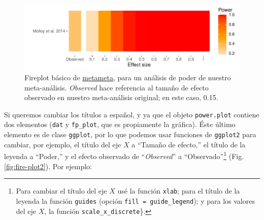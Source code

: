 \documentclass[
  bookmarksnumbered]{article}
\begin{document}
\begin{figure}
\centering
\includegraphics{Meta-analysis_files/figure-latex/fire-plot1-1.pdf}
\caption{\label{fig:fire-plot1}Fireplot básico de \href{https://www.dsquintana.blog/metameta-r-package-meta-analysis/}{metameta}, para un análisis de poder de nuestro meta-análisis. \emph{Observed} hace referencia al tamaño de efecto observado en nuestro meta-análisis original; en este caso, 0.15.}
\end{figure}

Si queremos cambiar los títulos a español, y ya que el objeto \texttt{power.plot} contiene dos elementos (\texttt{dat} y \texttt{fp\_plot}, que es propiamente la gráfica). Éste último elemento es de clase \texttt{ggplot}, por lo que podemos usar funciones de \texttt{ggplot2} para cambiar, por ejemplo, el título del eje \(X\) a ``Tamaño de efecto,'' el título de la leyenda a ``Poder,'' y el efecto observado de ``\emph{Observed}'' a ``Observado''\footnote{Para cambiar el título del eje \(X\) usé la función \texttt{xlab}; para el título de la leyenda la función \texttt{guides} (opción \texttt{fill\ =\ guide\_legend}); y para los valores del eje \(X\), la función \texttt{scale\_x\_discrete}\}.} (Fig. \ref{fig:fire-plot2}). Por ejemplo:
\end{document}
